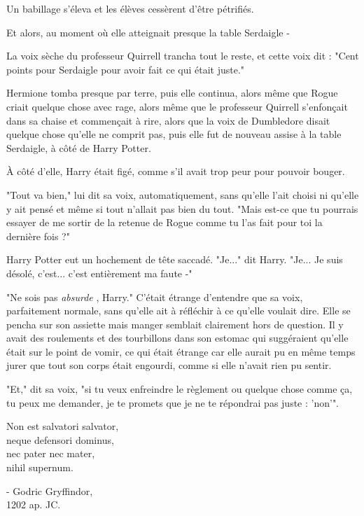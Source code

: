 Un babillage s'éleva et les élèves cessèrent d'être pétrifiés.

Et alors, au moment où elle atteignait presque la table Serdaigle -

La voix sèche du professeur Quirrell trancha tout le reste, et cette voix dit : "Cent points pour Serdaigle pour avoir fait ce qui était juste."

Hermione tomba presque par terre, puis elle continua, alors même que Rogue criait quelque chose avec rage, alors même que le professeur Quirrell s'enfonçait dans sa chaise et commençait à rire, alors que la voix de Dumbledore disait quelque chose qu'elle ne comprit pas, puis elle fut de nouveau assise à la table Serdaigle, à côté de Harry Potter.

À côté d'elle, Harry était figé, comme s'il avait trop peur pour pouvoir bouger.

"Tout va bien," lui dit sa voix, automatiquement, sans qu'elle l'ait choisi ni qu'elle y ait pensé et même si tout n'allait pas bien du tout. "Mais est-ce que tu pourrais essayer de me sortir de la retenue de Rogue comme tu l'as fait pour toi la dernière fois ?"

Harry Potter eut un hochement de tête saccadé. "Je..." dit Harry. "Je... Je suis désolé, c'est... c'est entièrement ma faute -"

"Ne sois pas \emph{absurde} , Harry." C'était étrange d'entendre que sa voix, parfaitement normale, sans qu'elle ait à réfléchir à ce qu'elle voulait dire. Elle se pencha sur son assiette mais manger semblait clairement hors de question. Il y avait des roulements et des tourbillons dans son estomac qui suggéraient qu'elle était sur le point de vomir, ce qui était étrange car elle aurait pu en même temps jurer que tout son corps était engourdi, comme si elle n'avait rien pu sentir.

"Et," dit sa voix, "si tu veux enfreindre le règlement ou quelque chose comme ça, tu peux me demander, je te promets que je ne te répondrai pas juste : 'non'".


\begin{center}Non est salvatori salvator,\\neque defensori dominus,\\nec pater nec mater,\\nihil supernum.\end{center}



\begin{center}- Godric Gryffindor,\\1202 ap. JC.\end{center}


